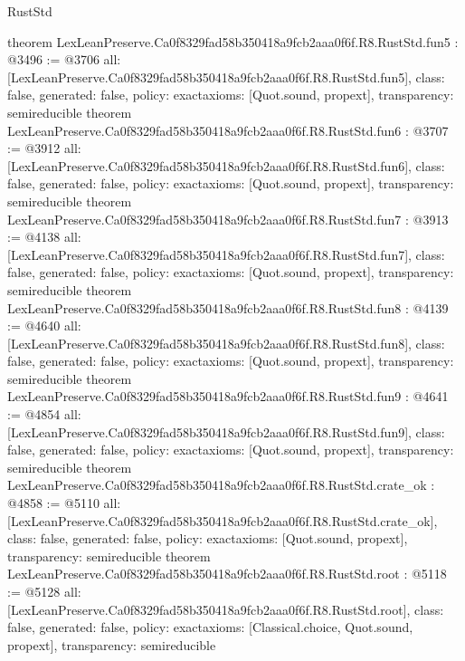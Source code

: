 \begin{lexlean}{RustStd}
\begin{coremodule}
{}
theorem LexLeanPreserve.Ca0f8329fad58b350418a9fcb2aaa0f6f.R8.RustStd.fun5 : @3496 := @3706 {
  all: [LexLeanPreserve.Ca0f8329fad58b350418a9fcb2aaa0f6f.R8.RustStd.fun5],
  class: false,
  generated: false,
  policy: exact{axioms: [Quot.sound, propext]},
  transparency: semireducible
}
theorem LexLeanPreserve.Ca0f8329fad58b350418a9fcb2aaa0f6f.R8.RustStd.fun6 : @3707 := @3912 {
  all: [LexLeanPreserve.Ca0f8329fad58b350418a9fcb2aaa0f6f.R8.RustStd.fun6],
  class: false,
  generated: false,
  policy: exact{axioms: [Quot.sound, propext]},
  transparency: semireducible
}
theorem LexLeanPreserve.Ca0f8329fad58b350418a9fcb2aaa0f6f.R8.RustStd.fun7 : @3913 := @4138 {
  all: [LexLeanPreserve.Ca0f8329fad58b350418a9fcb2aaa0f6f.R8.RustStd.fun7],
  class: false,
  generated: false,
  policy: exact{axioms: [Quot.sound, propext]},
  transparency: semireducible
}
theorem LexLeanPreserve.Ca0f8329fad58b350418a9fcb2aaa0f6f.R8.RustStd.fun8 : @4139 := @4640 {
  all: [LexLeanPreserve.Ca0f8329fad58b350418a9fcb2aaa0f6f.R8.RustStd.fun8],
  class: false,
  generated: false,
  policy: exact{axioms: [Quot.sound, propext]},
  transparency: semireducible
}
theorem LexLeanPreserve.Ca0f8329fad58b350418a9fcb2aaa0f6f.R8.RustStd.fun9 : @4641 := @4854 {
  all: [LexLeanPreserve.Ca0f8329fad58b350418a9fcb2aaa0f6f.R8.RustStd.fun9],
  class: false,
  generated: false,
  policy: exact{axioms: [Quot.sound, propext]},
  transparency: semireducible
}
theorem LexLeanPreserve.Ca0f8329fad58b350418a9fcb2aaa0f6f.R8.RustStd.crate_ok : @4858 := @5110 {
  all: [LexLeanPreserve.Ca0f8329fad58b350418a9fcb2aaa0f6f.R8.RustStd.crate_ok],
  class: false,
  generated: false,
  policy: exact{axioms: [Quot.sound, propext]},
  transparency: semireducible
}
theorem LexLeanPreserve.Ca0f8329fad58b350418a9fcb2aaa0f6f.R8.RustStd.root : @5118 := @5128 {
  all: [LexLeanPreserve.Ca0f8329fad58b350418a9fcb2aaa0f6f.R8.RustStd.root],
  class: false,
  generated: false,
  policy: exact{axioms: [Classical.choice, Quot.sound, propext]},
  transparency: semireducible
}


\end{coremodule}
\end{lexlean}
